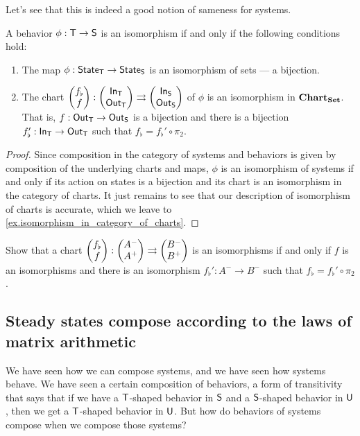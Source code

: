 \documentclass[DynamicalBook]{subfiles}
\begin{document}
Let's see that this is indeed a good notion of sameness for systems.
\begin{proposition}\label{prop.isomorphism_of_systems_discrete}
  A behavior $\phi : \mathsf{T} \to \mathsf{S}$ is an isomorphism if and only if the
  following conditions hold:
\begin{enumerate}
  \item The map $\phi : \mathsf{State}_{\mathsf{T}} \to \mathsf{State}_{\mathsf{S}}$ is an isomorphism of sets --- a
    bijection.
  \item The chart $\begin{pmatrix}{f_{\flat}} \\ {f} \end{pmatrix} : \begin{pmatrix}{\mathsf{In}_{\mathsf{T}}} \\ {\mathsf{Out}_{\mathsf{T}}} \end{pmatrix}
    \rightrightarrows \begin{pmatrix}{\mathsf{In}_{\mathsf{S}}} \\ {\mathsf{Out}_{\mathsf{S}}} \end{pmatrix}$ of $\phi$ is an isomorphism in
    $\textbf{Chart}_{\textbf{Set}}$. That is, $f : \mathsf{Out}_{\mathsf{T}} \to \mathsf{Out}_{\mathsf{S}}$ is a bijection
    and there is a bijection $f_{\flat}' : \mathsf{In}_{\mathsf{T}} \to \mathsf{Out}_{\mathsf{T}}$ such that
    $f_{\flat} = f_{\flat}' \circ \pi_2$.
\end{enumerate}
\end{proposition}
\begin{proof}
  Since composition in the category of systems and behaviors is given by
  composition of the underlying charts and maps, $\phi$ is an isomorphism of
  systems if and only if its action on states is a bijection and its chart is an
  isomorphism in the category of charts. It just remains to see that our
  description of isomorphism of charts is accurate, which we leave to \cref{ex.isomorphism_in_category_of_charts}.
\end{proof}

\begin{exercise}\label{ex.isomorphism_in_category_of_charts}
  Show that a chart $\begin{pmatrix}{f_{\flat}} \\ {f} \end{pmatrix} : \begin{pmatrix}{A^-} \\ {A^+} \end{pmatrix}
    \rightrightarrows \begin{pmatrix}{B^-} \\ {B^+} \end{pmatrix}$ is an isomorphisms if and only if $f$ is
    an isomorphisms and there is an isomorphism $f_{\flat}' : A^- \to B^-$ such
    that $f_{\flat} = f_{\flat}' \circ \pi_2$. 
\end{exercise}

\subsection{Steady states compose according to the laws of matrix arithmetic}\label{sec.steady_states_matrix_arithmetic}


We have seen how we can compose systems, and we have seen how systems behave. We
have seen a certain composition of behaviors, a form of transitivity that says
that if we have a $\mathsf{T}$-shaped behavior in $\mathsf{S}$ and a $\mathsf{S}$-shaped
behavior in $\mathsf{U}$, then we get a $\mathsf{T}$-shaped behavior in $\mathsf{U}$. But
how do behaviors of systems compose when we compose those systems?
\end{document}

